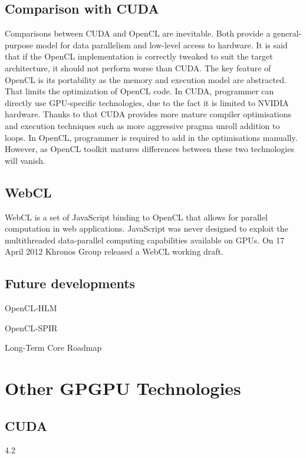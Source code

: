 \subsection{Comparison with CUDA}
Comparisons between CUDA and OpenCL are inevitable. Both provide a general-purpose model for data parallelism and low-level access to hardware. It is said that if the OpenCL implementation is correctly tweaked to suit the target architecture, it should not perform worse than CUDA. The key feature of OpenCL is its portability as the memory and execution model are abstracted. That limits the optimization of OpenCL code. In CUDA, programmer can directly use GPU-specific technologies, due to the fact it is limited to NVIDIA hardware. Thanks to that CUDA provides more mature compiler optimisations and execution techniques such as more aggressive pragma unroll addition to loops. In OpenCL, programmer is required to add in the optimisations manually. However, as OpenCL toolkit matures differences between these two technologies will vanish.


\subsection{WebCL}
WebCL is a set of JavaScript binding to OpenCL that allows for parallel computation in web applications. JavaScript was never designed to exploit the multithreaded data-parallel computing capabilities available on GPUs. On 17 April 2012 Khronos Group released a WebCL working draft.

\subsection{Future developments}
OpenCL-HLM

OpenCL-SPIR

Long-Term Core Roadmap


\section{Other GPGPU Technologies}
\subsection{CUDA}

4.2

